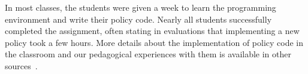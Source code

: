 In most classes, the students were given a week to learn the programming
environment and write their policy code.  Nearly all students successfully
completed the assignment, often stating in evaluations that implementing a new 
policy took a few hours.   More details about the implementation of policy
code in the classroom and our pedagogical experiences with them is available
in other sources~\cite{Cappos_SIGCSE_2014, Hooshangi_SIGCSE_2015}.






